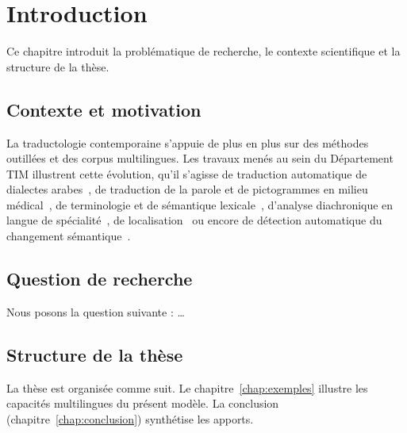 \chapter{Introduction}
\label{chap:introduction}

Ce chapitre introduit la problématique de recherche, le contexte
scientifique et la structure de la thèse.

\section{Contexte et motivation}

La traductologie contemporaine s'appuie de plus en plus sur des
méthodes outillées et des corpus multilingues. Les travaux menés au sein
du Département TIM illustrent cette évolution, qu'il s'agisse de
traduction automatique de dialectes
arabes~\autocite{almaoui-etal-2025-arabizi,mutal-etal-2026-aladdin},
de traduction de la parole et de pictogrammes en milieu
médical~\autocite{bouillon-etal-2021-speech,gerlach-etal-2024-concept},
de terminologie et de sémantique
lexicale~\autocite{bouillon-etal-2012-annotating}, d'analyse
diachronique en langue de spécialité~\autocite{picton2009diachronie}, de
localisation~\autocite{morado-vazquez-etal-2013-comparing} ou encore de
détection automatique du changement
sémantique~\autocite{schlechtweg-etal-2020-semeval,perrone-etal-2019-gasc,hengchen-etal-2021-challenges}.

\section{Question de recherche}

Nous posons la question suivante : \dots

\section{Structure de la thèse}

La thèse est organisée comme suit. Le
chapitre~\ref{chap:exemples} illustre les capacités multilingues du
présent modèle. La conclusion (chapitre~\ref{chap:conclusion})
synthétise les apports.
